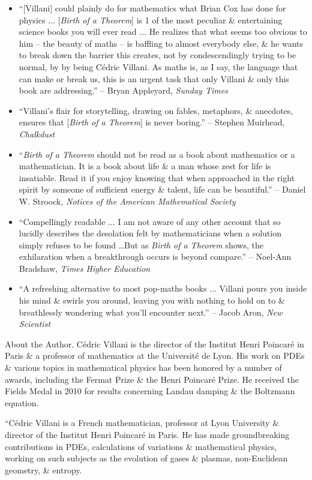 \documentclass{article}
\begin{document}
\begin{enumerate}
\begin{itemize}
		\item ``[{\sc Villani}] could plainly do for mathematics what {\sc Brian Cox} has done for physics $\ldots$ [{\it Birth of a Theorem}] is 1 of the most peculiar \& entertaining science books you will ever read $\ldots$ He realizes that what seems too obvious to him -- the beauty of maths -- is baffling to almost everybody else, \& he wants to break down the barrier this creates, not by condescendingly trying to be normal, by by being {\sc C\'edric Villani}. As maths is, as I say, the language that can make or break us, this is an urgent task that only {\sc Villani} \& only this book are addressing.'' -- {\sc Bryan Appleyard}, {\it Sunday Times}
		\item ``{\sc Villani}'s flair for storytelling, drawing on fables, metaphors, \& anecdotes, ensures that [{\it Birth of a Theorem}] is never boring.'' -- {\sc Stephen Muirhead}, {\it Chalkdust}
		\item ``{\it Birth of a Theorem} should not be read as a book about mathematics or a mathematician. It is a book about life \& a man whose zest for life is insatiable. Read it if you enjoy knowing that when approached in the right spirit by someone of sufficient energy \& talent, life can be beautiful.'' -- {\sc Daniel W. Stroock}, {\it Notices of the American Mathematical Society}
		\item ``Compellingly readable $\ldots$ I am not aware of any other account that so lucidly describes the desolation felt by mathematicians when a solution simply refuses to be found \ldots But as {\it Birth of a Theorem} shows, the exhilaration when a breakthrough occurs is beyond compare.'' -- {\sc Noel-Ann Bradshaw}, {\it Times Higher Education}
		\item ``A refreshing alternative to most pop-maths books $\ldots$ {\sc Villani} pours you inside his mind \& swirls you around, leaving you with nothing to hold on to \& breathlessly wondering what you'll encounter next.'' -- {\sc Jacob Aron}, {\it New Scientist}
	\end{itemize}
	{\sf About the Author.} {\sc C\'edric Villani} is the director of the Institut Henri Poincaré in Paris \& a professor of mathematics at the Université de Lyon. His work on PDEs \& various topics in mathematical physics has been honored by a number of awards, including the Fermat Prize \& the Henri Poincar\'e Prize. He received the Fields Medal in 2010 for results concerning Landau damping \& the Boltzmann equation.
	
	``{\sc C\'edric Villani} is a French mathematician, professor at Lyon University \& director of the Institut Henri Poincaré in Paris. He has made groundbreaking contributions in PDEs, calculations of variations \& mathematical physics, working on such subjects as the evolution of gases \& plasmas, non-Euclidean geometry, \& entropy.
	

\end{enumerate}
\end{document}
